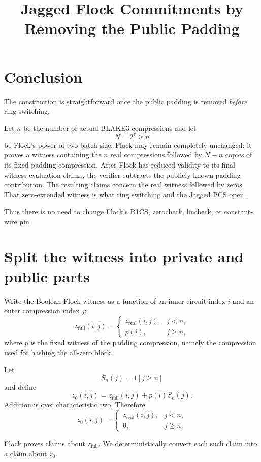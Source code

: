\documentclass[11pt]{article}
\title{Jagged Flock Commitments by Removing the Public Padding}
\author{}
\date{}
\begin{document}
\maketitle

\section{Conclusion}

The construction is straightforward once the public padding is removed
\emph{before} ring switching.

Let \(n\) be the number of actual BLAKE3 compressions and let
\[
    N=2^\tau\geq n
\]
be Flock's power-of-two batch size.  Flock may remain completely unchanged:
it proves a witness containing the \(n\) real compressions followed by \(N-n\)
copies of its fixed padding compression.  After Flock has reduced validity to
its final witness-evaluation claims, the verifier subtracts the publicly known
padding contribution.  The resulting claims concern the real witness followed
by zeros.  That zero-extended witness is what ring switching and the Jagged PCS
open.

Thus there is no need to change Flock's R1CS, zerocheck, lincheck, or
constant-wire pin.

\section{Split the witness into private and public parts}

Write the Boolean Flock witness as a function of an inner circuit index \(i\)
and an outer compression index \(j\):
\[
 z_{\mathrm{full}}(i,j)=
 \begin{cases}
   z_{\mathrm{real}}(i,j), & j<n,\\
   p(i),                   & j\geq n,
 \end{cases}
\]
where \(p\) is the fixed witness of the padding compression, namely the
compression used for hashing the all-zero block.

Let
\[
    S_n(j)=1[j\geq n]
\]
and define
\[
    z_0(i,j)
      =z_{\mathrm{full}}(i,j)+p(i)S_n(j).
\]
Addition is over characteristic two.  Therefore
\[
 z_0(i,j)=
 \begin{cases}
   z_{\mathrm{real}}(i,j), & j<n,\\
   0,                       & j\geq n.
 \end{cases}
\]

Flock proves claims about \(z_{\mathrm{full}}\).  We deterministically convert
each such claim into a claim about \(z_0\).
\end{document}
